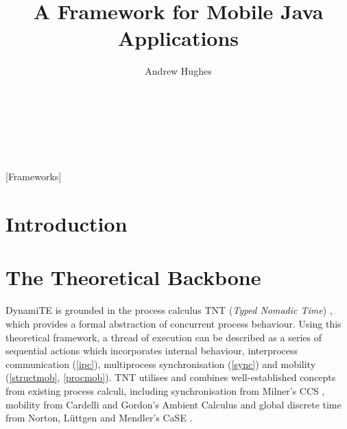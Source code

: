 \documentclass{acm_proc_article-sp}
\begin{document}
\title{A Framework for Mobile Java Applications}
\author{
\alignauthor
Andrew Hughes\\
       \\
       \\
       \\
       \\
}
\maketitle

\begin{abstract}
\end{abstract}

[Frameworks]



\section{Introduction}

\section{The Theoretical Backbone}

DynamiTE is grounded in the process calculus TNT (\emph{Typed Nomadic
Time}) \cite{hughes:nt, tnt}, which provides a formal abstraction of
concurrent process behaviour.  Using this theoretical framework, a
thread of execution can be described as a series of sequential actions
which incorporates internal behaviour, interprocess communication
(\ref{ipc}), multiprocess synchronisation (\ref{sync}) and mobility
(\ref{structmob}, \ref{procmob}).  TNT utilises and combines
well-established concepts from existing process calculi, including
synchronisation from Milner's CCS \cite{milner:ccs}, mobility from
Cardelli and Gordon's Ambient Calculus \cite{amb} and global discrete
time from Norton, L{\"u}ttgen and Mendler's CaSE \cite{case}.
\end{document}
